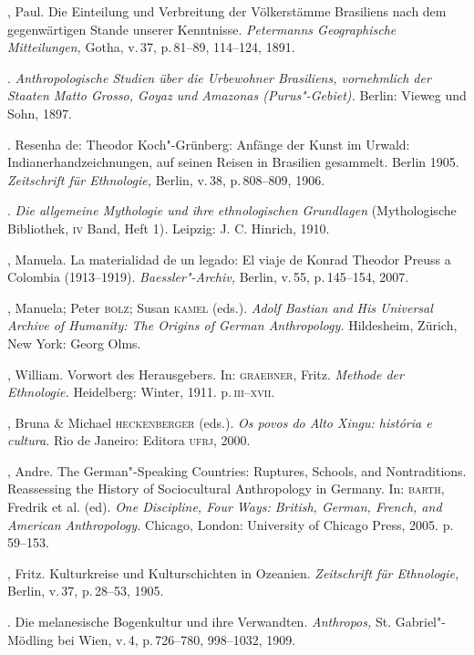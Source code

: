 \begin{bibliohedra}
 , Paul. Die Einteilung und Verbreitung der Völkerstämme
 Brasiliens nach dem gegenwärtigen Stande unserer Kenntnisse.
 \textit{Petermanns Geographische Mitteilungen,} Gotha, v.\,37, p.\,81--89,
 114--124, 1891.

 \titidem. \textit{Anthropologische Studien über die
 Urbewohner Brasiliens, vornehmlich der Staaten Matto Grosso, Goyaz und
 Amazonas (Purus"-Gebiet).} Berlin: Vieweg und Sohn, 1897.

 \titidem. Resenha de: Theodor Koch"-Grünberg: Anfänge der
 Kunst im Urwald: Indianerhandzeichnungen, auf seinen Reisen in Brasilien
 gesammelt. Berlin 1905. \textit{Zeitschrift für Ethnologie,} Berlin, v.\,38, p.\,808--809, 1906.

 \titidem. \textit{Die allgemeine Mythologie und ihre
 ethnologischen Grundlagen} (Mythologische Bibliothek, \textsc{iv} Band, Heft
 1)\textit{.} Leipzig: J. C. Hinrich, 1910.

 , Manuela. La materialidad de un legado: El viaje de Konrad
 Theodor Preuss a Colombia (1913--1919). \textit{Baessler"-Archiv,} Berlin,
 v.\,55, p.\,145--154, 2007.

 , Manuela; Peter \textsc{bolz}; Susan \textsc{kamel} (eds.). \textit{Adolf Bastian
 and His Universal Archive of Humanity: The Origins of German
 Anthropology.} Hildesheim, Zürich, New York: Georg Olms.

 , William. Vorwort des Herausgebers. In: \textsc{graebner}, Fritz.
 \textit{Methode der Ethnologie.} Heidelberg: Winter, 1911. p.\,\textsc{iii--xvii}.

 , Bruna \& Michael \textsc{heckenberger} (eds.). \textit{Os povos do
 Alto Xingu: história e cultura.} Rio de Janeiro: Editora \textsc{ufrj}, 2000.

 , Andre. The German"-Speaking Countries: Ruptures, Schools, and
 Nontraditions. Reassessing the History of Sociocultural Anthropology in
 Germany. In: \textsc{barth}, Fredrik et al. (ed). \textit{One Discipline, Four
 Ways: British, German, French, and American Anthropology.} Chicago,
 London: University of Chicago Press, 2005. p.\,59--153.

 , Fritz. Kulturkreise und Kulturschichten in Ozeanien.
 \textit{Zeitschrift für Ethnologie,} Berlin, v.\,37, p.\,28--53, 1905.

 \titidem. Die melanesische Bogenkultur und ihre Verwandten.
 \textit{Anthropos,} St. Gabriel"-Mödling bei Wien, v.\,4, p.\,726--780,
 998--1032, 1909.


\end{bibliohedra}
